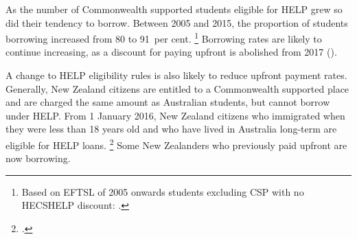 \documentclass[embargoed]{grattan}
\begin{document}
As the number of \gls{Commonwealth supported} students eligible for \gls{HELP} grew so did their tendency to borrow.
Between 2005 and 2015, the proportion of students borrowing increased from 80 to 91~per cent.%
\footnote{Based on \gls{EFTSL} of 2005 onwards students excluding CSP with no \gls{HECSHELP} discount: \textcite[][section 5: liability status categories]{EducationvariousyearsSelectedhighereducation}.} Borrowing rates are likely to continue increasing, as a discount for paying upfront is abolished from 2017 ().

A change to \gls{HELP} eligibility rules is also likely to reduce upfront payment rates.
Generally, New Zealand citizens are entitled to a \gls{Commonwealth supported} place and are charged the same amount as Australian students, but cannot borrow under \gls{HELP}\@.
From 1 January 2016, New Zealand citizens who immigrated when they were less than 18 years old and who have lived in Australia long-term are eligible for \gls{HELP} loans.%
\footcite{Education2016FAQsNewZealand} Some New Zealanders who previously paid upfront are now borrowing.
\end{document}
